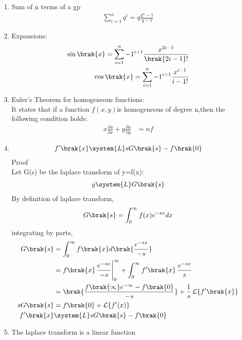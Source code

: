\begin{enumerate}[label=\thesubsection.\arabic*,ref=\thesubsection.\theenumi]
\item
Sum of n terms of a gp\\
\begin{align}
	\sum_{i=1}^{n}q^i=q\frac{q^n-1}{q-1}\label{eq:sumofgp}
\end{align}
\item
Expansions:\label{eq:expansions}\\
\begin{align}
	\sin\brak{x}=\sum_{i=1}^{n}-1^{i+1}\frac{x^{2i-1}}{\brak{2i-1}!}\\
	\cos\brak{x}=\sum_{i=1}^{n}-1^{i+1}\frac{x^{i-1}}{{i-1}!}
\end{align}
\item
Euler's Theorem for homogeneous functions:\\
It states that if a function $f(x,y)$is homogeneous of degree n,then the following condition holds:\\
\begin{align}
    x\frac{\partial u}{\partial x}+y\frac{\partial u}{\partial y}&=nf\label{eq:eulerhomo}
\end{align}
\item
\begin{equation}
	f'\brak{x}\system{L}sG\brak{s}-f\brak{0}\label{eq:laplace1d}
\end{equation}
Proof\\
Let G(s) be the laplace transform of y=f(x):\\
\begin{align}
    y\system{L}G\brak{s}
\end{align}
By definition of laplace transform,\\
\begin{align}
	G\brak{s}=\int_{0}^{\infty}f(x)e^{-sx}dx
\end{align}
integrating by parts,
\begin{align}
	G\brak{s}&=\int_0^{\infty}f\brak{x}d\brak{\frac{e^{-sx}}{-s}}\\
			 &=f\brak{x}\,\frac{e^{-sx}}{-s}\Bigg|_0^{\infty}+\int_0^{\infty}f'\brak{x}\,\frac{e^{-sx}}{s}\\
			 &=\brak{\frac{f\brak{\infty}e^{-\infty}-f\brak{0}}{-s}}+\frac{1}{s}\,\mathcal{L}\{f'\brak{x}\}\\
			 sG\brak{s}&=f\brak{0}+\mathcal{L}\{f'(x)\}\\
			 f'\brak{x}&\system{L}sG\brak{s}-f\brak{0}			 		
\end{align}
\item
The laplace transform is a linear function\label{eq:linearlaplace}

\end{enumerate}
